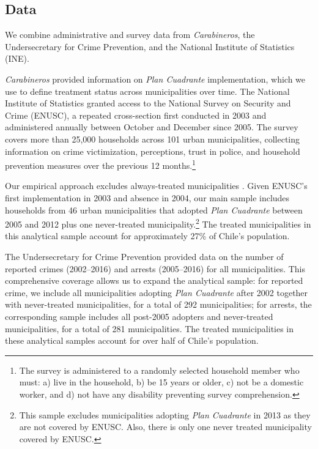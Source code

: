 ﻿\subsection{Data}

We combine administrative and survey data from \emph{Carabineros}, the Undersecretary for Crime Prevention, and the National Institute of Statistics (INE). 

\emph{Carabineros} provided information on \emph{Plan Cuadrante} implementation, which we use to define treatment status across municipalities over time. The National Institute of Statistics granted access to the National Survey on Security and Crime (ENUSC), a repeated cross-section first conducted in 2003 and administered annually between October and December since 2005. The survey covers more than 25,000 households across 101 urban municipalities, collecting information on crime victimization, perceptions, trust in police, and household prevention measures over the previous 12 months.\footnote{The survey is administered to a randomly selected household member who must: a) live in the household, b) be 15 years or older, c) not be a domestic worker, and d) not have any disability preventing survey comprehension.}

Our empirical approach excludes always-treated municipalities \citep{Callaway}. Given ENUSC's first implementation in 2003 and absence in 2004, our main sample includes households from 46 urban municipalities that adopted \emph{Plan Cuadrante} between 2005 and 2012 plus one never-treated municipality.\footnote{This sample excludes municipalities adopting \emph{Plan Cuadrante} in 2013 as they are not covered by ENUSC. Also, there is only one never treated municipality covered by ENUSC.} The treated municipalities in this analytical sample account for approximately 27\% of Chile's population. 


The Undersecretary for Crime Prevention provided data on the number of reported crimes (2002--2016) and arrests (2005--2016) for all municipalities. This comprehensive coverage allows us to expand the analytical sample: for reported crime, we include all municipalities adopting \emph{Plan Cuadrante} after 2002 together with never-treated municipalities, for a total of 292 municipalities; for arrests, the corresponding sample includes all post-2005 adopters and never-treated municipalities, for a total of 281 municipalities. The treated municipalities in these analytical samples account for over half of Chile's population.


